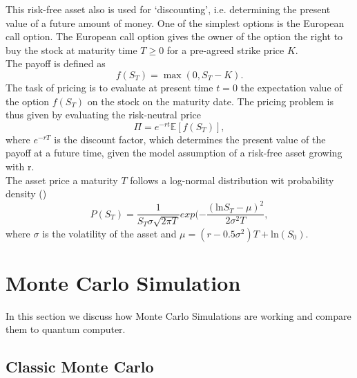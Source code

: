 \documentclass[a4paper, 12pt, one column, aas_macros]{article}
\begin{document}
This risk-free asset also is used for ‘discounting’, i.e. determining the present value of a future amount of money.
One of the simplest options is the European call option. The European call option gives the owner of the option the right to buy the stock at maturity time $T \geq 0$ for a pre-agreed strike price $K$.\\
The payoff is defined as
\begin{equation}
    f(S_T) = \max(0, S_T - K ).
\end{equation}
The task of pricing is to evaluate at present time $t = 0$ the expectation value of the option $f(S_T)$ on the stock on the maturity date.
The pricing problem is thus given by evaluating the risk-neutral price
\begin{equation}
    \Pi = e^{-rt} \mathbb{E}[f(S_T)],
\end{equation}
where $e^{-rT}$ is the discount factor, which determines the present value of the payoff at a future time, given the model assumption of a risk-free asset growing with r.\\
The asset price a maturity $T$ follows a log-normal distribution wit probability density (\cite{1905.02666})
\begin{equation}
    P(S_T) = \frac{1}{S_T \sigma \sqrt{2 \pi T}} exp (- \frac{(\text{ln} S_T - \mu)^2}{2 \sigma^2 T}, \label{eq:lognormal}
\end{equation}
where $\sigma$ is the volatility of the asset and $\mu = (r-0.5\sigma^2)T + \text{ln}(S_0)$.

\section{Monte Carlo Simulation}    
In this section we discuss how Monte Carlo Simulations are working and compare them to quantum computer.
\subsection{Classic Monte Carlo}
\end{document}
